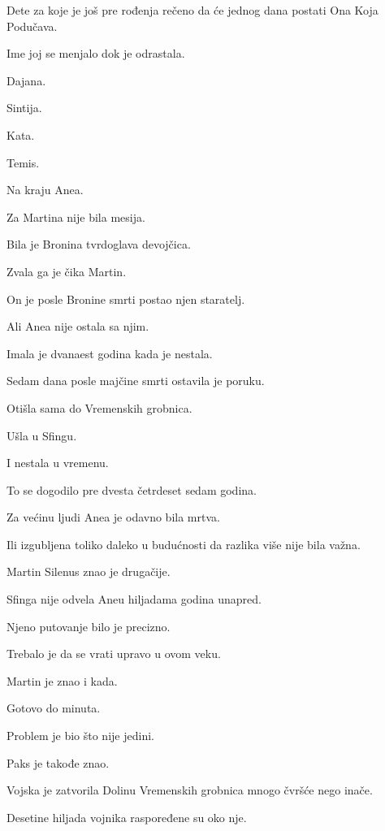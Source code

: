 Dete za koje je još pre rođenja rečeno da će jednog dana postati Ona Koja Podučava.

\bigskip

Ime joj se menjalo dok je odrastala.

Dajana.

Sintija.

Kata.

Temis.

Na kraju Anea.

\bigskip

Za Martina nije bila mesija.

Bila je Bronina tvrdoglava devojčica.

Zvala ga je čika Martin.

On je posle Bronine smrti postao njen staratelj.

\bigskip

Ali Anea nije ostala sa njim.

Imala je dvanaest godina kada je nestala.

Sedam dana posle majčine smrti ostavila je poruku.

Otišla sama do Vremenskih grobnica.

Ušla u Sfingu.

I nestala u vremenu.

\bigskip

To se dogodilo pre dvesta četrdeset sedam godina.

Za većinu ljudi Anea je odavno bila mrtva.

Ili izgubljena toliko daleko u budućnosti da razlika više nije bila važna.

Martin Silenus znao je drugačije.

\bigskip

Sfinga nije odvela Aneu hiljadama godina unapred.

Njeno putovanje bilo je precizno.

Trebalo je da se vrati upravo u ovom veku.

\bigskip

Martin je znao i kada.

Gotovo do minuta.

\bigskip

Problem je bio što nije jedini.

Paks je takođe znao.

\bigskip

Vojska je zatvorila Dolinu Vremenskih grobnica mnogo čvršće nego inače.

Desetine hiljada vojnika raspoređene su oko nje.

